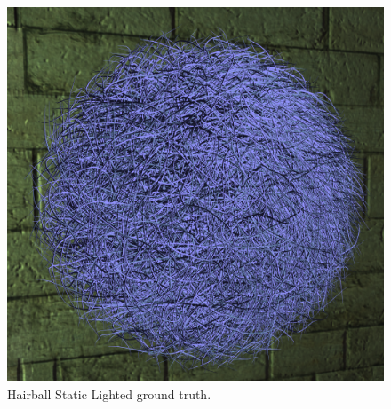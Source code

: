 \documentclass{cslthse-msc}
\begin{document}
\begin{figure}[H]
	\centering
	\includegraphics[scale=0.2]{images/results/hairball_light_sobel_ground_truth.png}
	\caption{Hairball Static Lighted ground truth.}\label{fig:hairball_static_lighted_truth}
\end{figure}
\end{document}
